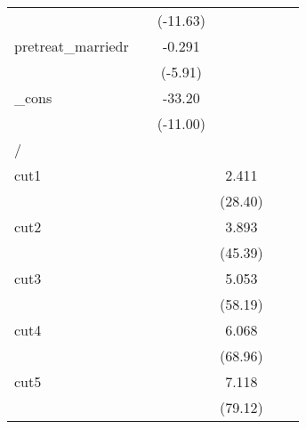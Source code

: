 {\begin{tabular}{l*{5}{c}}
            &                     &    (-11.63)         &                     &                     &                     \\
[1em]
pretreat\_marriedr&                     &      -0.291\sym{***}&                     &                     &                     \\
            &                     &     (-5.91)         &                     &                     &                     \\
[1em]
\_cons      &                     &      -33.20\sym{***}&                     &                     &                     \\
            &                     &    (-11.00)         &                     &                     &                     \\
\hline
/           &                     &                     &                     &                     &                     \\
cut1        &                     &                     &       2.411\sym{***}&                     &                     \\
            &                     &                     &     (28.40)         &                     &                     \\
[1em]
cut2        &                     &                     &       3.893\sym{***}&                     &                     \\
            &                     &                     &     (45.39)         &                     &                     \\
[1em]
cut3        &                     &                     &       5.053\sym{***}&                     &                     \\
            &                     &                     &     (58.19)         &                     &                     \\
[1em]
cut4        &                     &                     &       6.068\sym{***}&                     &                     \\
            &                     &                     &     (68.96)         &                     &                     \\
[1em]
cut5        &                     &                     &       7.118\sym{***}&                     &                     \\
            &                     &                     &     (79.12)         &                     &                     \\

\end{tabular}}
